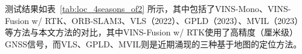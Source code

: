 



测试结果如表~\ref{tab:loc_4seasons_of2} 所示，其中包括了VINS-Mono、VINS-Fusion w/ RTK、ORB-SLAM3、VLS\cite{yang2022real}（2022）、GPLD\cite{hao2023global}（2023）、MVIL\cite{zhang2023map}（2023）等方法与本文方法的对比，其中VINS-Fusion w/ RTK使用了高精度（厘米级）GNSS信号，而VLS、GPLD、MVIL则是近期涌现的三种基于地图的定位方法。

